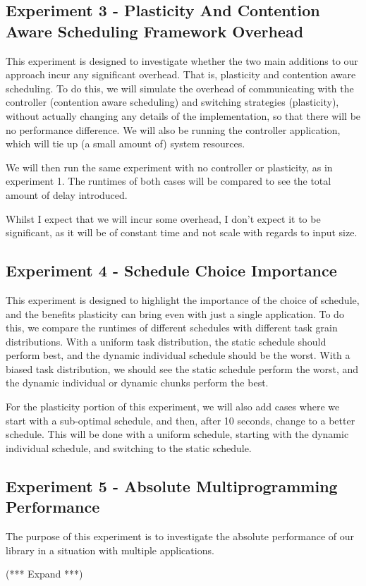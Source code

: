 



\subsection{Experiment 3 - Plasticity And Contention Aware Scheduling Framework Overhead}

This experiment is designed to investigate whether the two main additions to our approach incur any significant overhead. That is, plasticity and contention aware scheduling. To do this, we will simulate the overhead of communicating with the controller (contention aware scheduling) and switching strategies (plasticity), without actually changing any details of the implementation, so that there will be no performance difference. We will also be running the controller application, which will tie up (a small amount of) system resources.

We will then run the same experiment with no controller or plasticity, as in experiment 1. The runtimes of both cases will be compared to see the total amount of delay introduced.

Whilst I expect that we will incur some overhead, I don't expect it to be significant, as it will be of constant time and not scale with regards to input size.





\subsection{Experiment 4 - Schedule Choice Importance}

This experiment is designed to highlight the importance of the choice of schedule, and the benefits plasticity can bring even with just a single application. To do this, we compare the runtimes of different schedules with different task grain distributions. With a uniform task distribution, the static schedule should perform best, and the dynamic individual schedule should be the worst. With a biased task distribution, we should see the static schedule perform the worst, and the dynamic individual or dynamic chunks perform the best.

For the plasticity portion of this experiment, we will also add cases where we start with a sub-optimal schedule, and then, after 10 seconds, change to a better schedule. This will be done with a uniform schedule, starting with the dynamic individual schedule, and switching to the static schedule.





\subsection{Experiment 5 - Absolute Multiprogramming Performance}

The purpose of this experiment is to investigate the absolute performance of our library in a situation with multiple applications. 

(*** Expand ***)


